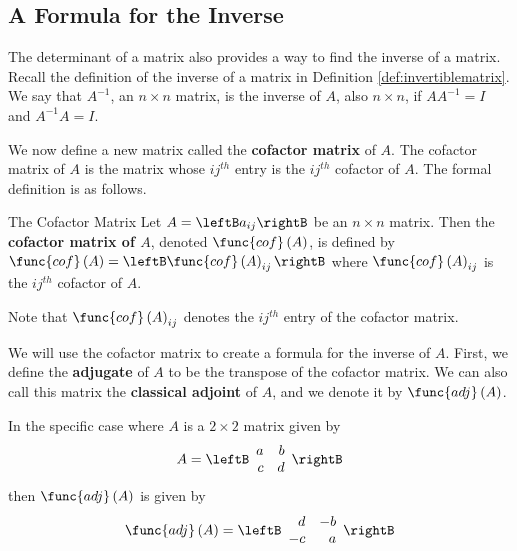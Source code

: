 \subsection{A Formula for the Inverse}

The determinant of a matrix also provides a way to find the inverse of a matrix.
Recall the definition of the inverse of a matrix in Definition \ref{def:invertiblematrix}.
We say that $A^{-1}$, an $n \times n$ matrix, is the inverse of $A$, also $n \times n$, if $AA^{-1} = I$ and $A^{-1}A=I$. 

We now define a new matrix called the \textbf{cofactor matrix} of $A$.  
The cofactor matrix of $A$ is the matrix whose $ij^{th}$ entry is the $ij^{th}$ cofactor of $A$.
The formal definition is as follows.

\begin{definition}{The Cofactor Matrix}\label{def:cofactormatrix}
Let $A=\leftB a_{ij}\rightB$ be an $n\times n$ matrix. Then the
 \textbf{cofactor matrix of $A$}, denoted 
$\func{cof}\left( A\right)$, is defined by $\func{cof}\left( A\right) =\leftB
\func{cof}\left(A\right)_{ij}\rightB $ where  $\func{cof}\left(A\right)_{ij}$ is the $ij^{th}$ cofactor of $A$.
\end{definition}

Note that $\func{cof}\left(A\right)_{ij}$ denotes the $ij^{th}$ entry of the cofactor matrix.

We will use the cofactor matrix to create a formula for the inverse of $A$. First,
we define the \textbf{adjugate}  of $A$ to be the transpose of 
the cofactor matrix. We can also call this matrix the \textbf{classical adjoint}  of $A$,
and we denote it by $\func{adj} \left(A\right)$. 

In the specific case where $A$ is a $2 \times 2$ matrix given by
\begin{equation*}
A = \leftB
\begin{array}{rr}
a & b \\
c & d
\end{array}
\rightB
\end{equation*}
then $\func{adj}\left(A\right)$ is given by
\begin{equation*}
\func{adj}\left(A\right) = 
\leftB
\begin{array}{rr}
d & -b \\
-c & a
\end{array}
\rightB
\end{equation*}

